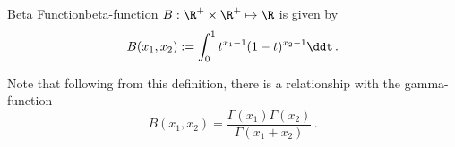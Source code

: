 \begin{definition}{Beta Function}{beta-function}
  $B: \R^+\times\R^+ \mapsto \R$ is given by
  $$B(x_1, x_2) := \int_0^1 t^{x_1-1}(1-t)^{x_2-1} \ddt\,.$$
\end{definition}

Note that following from this definition, there is a relationship with the gamma-function
$$B(x_1, x_2) = \frac{\Gamma(x_1) \Gamma(x_2)}{\Gamma(x_1 + x_2)}\,.$$
